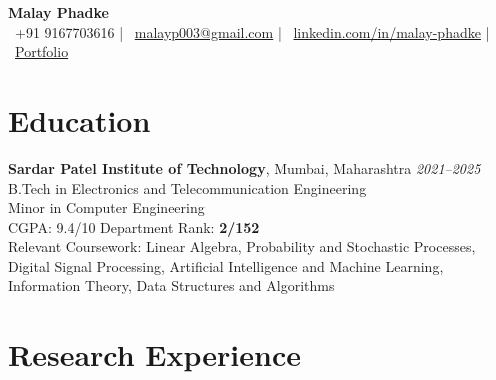 \documentclass[a4paper,10pt]{article}
\begin{document}
\begin{center}
    {\LARGE \textbf{Malay Phadke}}\\[4pt]
    \faPhone*~+91 9167703616 \quad | \quad
    \faEnvelope~\href{mailto:malayp003@gmail.com}{malayp003@gmail.com} \quad | \quad
    \faLinkedin~\href{https://linkedin.com/in/malay-phadke}{linkedin.com/in/malay-phadke} \quad | \quad
    \faGlobe~\href{https://malayphadke.github.io/portfolio/}{Portfolio}
\end{center}



\section*{Education}
\textbf{Sardar Patel Institute of Technology}, Mumbai, Maharashtra \hfill \textit{2021--2025}\\
B.Tech in Electronics and Telecommunication Engineering\\
Minor in Computer Engineering\\
CGPA: 9.4/10 \hfill Department Rank: \textbf{2/152}\\
Relevant Coursework: Linear Algebra, Probability and Stochastic Processes, Digital Signal Processing, Artificial Intelligence and Machine Learning, Information Theory, Data Structures and Algorithms
\section*{Research Experience}
\end{document}
